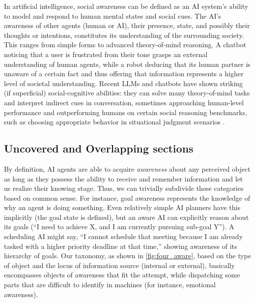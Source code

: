 In artificial intelligence, social awareness can be defined as an AI system's ability to model and respond to human mental states and social cues. The AI's awareness of other agents (human or AI), their presence, state, and possibly their thoughts or intentions, constitutes its understanding of the surrounding society. This ranges from simple forms to advanced theory-of-mind reasoning. A chatbot noticing that a user is frustrated from their tone grasps an external understanding of human agents, while a robot deducing that its human partner is unaware of a certain fact and thus offering that information represents a higher level of societal understanding. Recent LLMs and chatbots have shown striking (if superficial) social-cognitive abilities: they can solve many theory-of-mind tasks and interpret indirect cues in conversation, sometimes approaching human-level performance \citep{Kosinski2024, strachan2024testing, qiu2024evaluating} and outperforming humans on certain social reasoning benchmarks, such as choosing appropriate behavior in situational judgment scenarios \citep{Mittelstaedt2024}. 



\subsection{Uncovered and Overlapping sections}
By definition, AI agents are able to acquire \emph{awareness} about any perceived object as long as they possess the ability to receive and remember information and let us realize their knowing stage. Thus, we can trivially subdivide these categories based on common sense. For instance, goal awareness represents the knowledge of why an agent is doing something. Even relatively simple AI planners have this implicitly (the goal state is defined), but an aware AI can explicitly reason about its goals (``I need to achieve X, and I am currently pursuing sub-goal Y''). A scheduling AI might say, ``I cannot schedule that meeting because I am already tasked with a higher priority deadline at that time,'' showing awareness of its hierarchy of goals. Our taxonomy, as shown in \autoref{fig:four_aware}, based on the type of object and the locus of information source (internal or external), basically encompasses objects of awareness that fit the attempt, while dispatching some parts that are difficult to identify in machines (for instance, emotional awareness).

